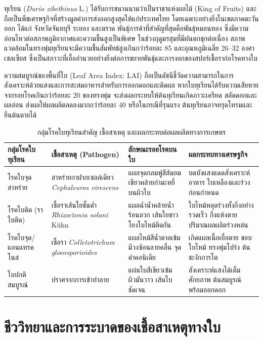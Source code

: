 ทุเรียน (\textit{Durio zibethinus} L.) ได้รับการขนานนามว่าเป็นราชาแห่งผลไม้ (King of Fruits) และถือเป็นพืชเศรษฐกิจที่สร้างมูลค่าการส่งออกสูงสุดให้แก่ประเทศไทย โดยเฉพาะอย่างยิ่งในเขตภาคตะวันออก ได้แก่ จังหวัดจันทบุรี ระยอง และตราด พันธุ์การค้าที่สำคัญที่สุดคือพันธุ์หมอนทอง ซึ่งมีความอ่อนไหวต่อสภาพภูมิอากาศและความชื้นสูงเป็นพิเศษ ในช่วงฤดูมรสุมที่มีฝนตกชุกต่อเนื่อง สภาพแวดล้อมในทรงพุ่มทุเรียนจะมีความชื้นสัมพัทธ์สูงเกินกว่าร้อยละ 85 และอุณหภูมิเฉลี่ย 26--32 องศาเซลเซียส ซึ่งเป็นสภาวะที่เอื้ออำนวยอย่างยิ่งต่อการขยายพันธุ์และการงอกของสปอร์เชื้อราก่อโรคทางใบ

ความสมบูรณ์ของพื้นที่ใบ (Leaf Area Index: LAI) ถือเป็นดัชนีชี้วัดความสามารถในการสังเคราะห์ด้วยแสงและการสะสมอาหารสำหรับการออกดอกและติดผล หากใบทุเรียนได้รับความเสียหายจากรอยโรคเกินกว่าร้อยละ 20 ของทรงพุ่ม จะส่งผลกระทบให้ต้นทุเรียนเกิดภาวะเครียด สลัดดอกและผลอ่อน ส่งผลให้ผลผลิตลดลงมากกว่าร้อยละ 40 หรือในกรณีที่รุนแรง ต้นทุเรียนอาจทรุดโทรมและยืนต้นตายได้

\begin{table}[H]
\caption{กลุ่มโรคใบทุเรียนสำคัญ เชื้อสาเหตุ และผลกระทบต่อผลผลิตทางการเกษตร}
\label{tab:ch01_diseases_overview}
\begin{tabularx}{\textwidth}{L{2.0cm}L{2.8cm}L{3.0cm}Y}
\toprule
\textbf{กลุ่มโรคใบทุเรียน} & \textbf{เชื้อสาเหตุ (Pathogen)} & \textbf{ลักษณะรอยโรคบนใบ} & \textbf{ผลกระทบทางเศรษฐกิจ} \\
\midrule
โรคใบจุดสาหร่าย & สาหร่ายกาฝากเซลล์เดียว \textit{Cephaleuros virescens} & แผลจุดกลมฟูสีส้มอมเขียวคล้ายกำมะหยี่บนผิวใบ & บดบังแสงแดดสังเคราะห์อาหาร ใบเหลืองและร่วงก่อนกำหนด \\
\addlinespace
โรคใบติด (ราใบติด) & เชื้อราเส้นใยชั้นต่ำ \textit{Rhizoctonia solani} Kühn & แผลฉ่ำน้ำคล้ายน้ำร้อนลวก เส้นใยขาวโยงใบไหม้ติดกัน & ใบไหม้หลุดร่วงทั้งกิ่งอย่างรวดเร็ว กิ่งแห้งตาย ปริมาณผลผลิตร่วงหล่น \\
\addlinespace
โรคใบจุด/แอนแทรคโนส & เชื้อรา \textit{Colletotrichum gloeosporioides} & แผลไหม้สีน้ำตาลเข้ม มีวงซ้อนลายคลื่น จุดดำคอนิเดีย & เกิดแผลเนื้อเยื่อตาย ขอบใบไหม้ ทรงพุ่มโปร่ง ต้นชะงักการโต \\
\addlinespace
ใบปกติสมบูรณ์ & ปราศจากการเข้าทำลาย & แผ่นใบสีเขียวเข้ม ผิวมันวาว เส้นใบชัดเจน & สังเคราะห์แสงได้เต็มศักยภาพ ต้นสมบูรณ์พร้อมออกดอก \\
\bottomrule
\end{tabularx}
\end{table}

\section{ชีววิทยาและการระบาดของเชื้อสาเหตุทางใบ}

